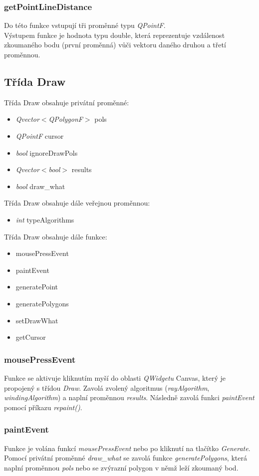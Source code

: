 \documentclass{article}
\begin{document}
\subsubsection{getPointLineDistance}
Do této funkce vstupují tři proměnné typu \emph{QPointF}.\\
Výstupem funkce je hodnota typu double, která reprezentuje vzdálenost zkoumaného bodu (první proměnná) vůči vektoru daného druhou a třetí proměnnou.

\newpage
\subsection{Třída Draw \label{sec:draw}}
Třída Draw obsahuje privátní proměnné:
\begin{itemize}
\item \emph{Qvector$<$QPolygonF$>$} pols
\item \emph{QPointF} cursor
\item \emph{bool} ignoreDrawPols
\item \emph{Qvector$<$bool$>$} results
\item \emph{bool} draw\_what
\end{itemize}

Třída Draw obsahuje dále veřejnou proměnnou:
\begin{itemize}
\item \emph{int} typeAlgorithms
\end{itemize}

Třída Draw obsahuje dále funkce:
\begin{itemize}
\item mousePressEvent
\item paintEvent
\item generatePoint
\item generatePolygons
\item setDrawWhat
\item getCursor
\end{itemize}

\subsubsection{mousePressEvent}
Funkce se aktivuje kliknutím myší do oblasti \emph{QWidgetu} Canvas, který je propojený s třídou \emph{Draw}. Zavolá zvolený algoritmus (\emph{rayAlgorithm},\emph{ windingAlgorithm}) a naplní proměnnou \emph{results}. Následně zavolá funkci \emph{paintEvent} pomocí příkazu \emph{repaint()}.

\subsubsection{paintEvent}
Funkce je volána funkcí \emph{mousePressEvent} nebo po kliknutí na tlačítko \emph{Generate}. Pomocí privátní proměnné \emph{draw\_what} se zavolá funkce \emph{generatePolygons}, která naplní proměnnou \emph{pols} nebo se zvýrazní polygon v němž leží zkoumaný bod.
\end{document}
